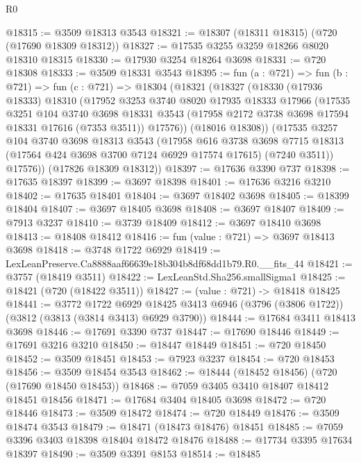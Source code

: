 \begin{lexlean}{R0}
\begin{coremodule}
@18315 := @3509 @18313 @3543
@18321 := @18307 (@18311 @18315) (@720 (@17690 @18309 @18312))
@18327 := @17535 @3255 @3259 @18266 @8020 @18310 @18315
@18330 := @17930 @3254 @18264 @3698
@18331 := @720 @18308
@18333 := @3509 @18331 @3543
@18395 := fun (a : @721) =>
  fun (b : @721) =>
  fun (c : @721) =>
  @18304
    (@18321
      (@18327
        (@18330
          (@17936 @18333)
          @18310
          (@17952
            @3253
            @3740
            @8020
            @17935
            @18333
            @17966
            (@17535
              @3251
              @104
              @3740
              @3698
              @18331
              @3543
              (@17958 @2172 @3738 @3698 @17594 @18331 @17616 (@7353 @3511))
              @17576))
          (@18016 @18308))
        (@17535
          @3257
          @104
          @3740
          @3698
          @18313
          @3543
          (@17958
            @616
            @3738
            @3698
            @7715
            @18313
            (@17564 @424 @3698 @3700 @7124 @6929 @17574 @17615)
            (@7240 @3511))
          @17576))
      (@17826 @18309 @18312))
@18397 := @17636 @3390 @737
@18398 := @17635 @18397
@18399 := @3697 @18398
@18401 := @17636 @3216 @3210
@18402 := @17635 @18401
@18404 := @3697 @18402 @3698
@18405 := @18399 @18404
@18407 := @3697 @18405 @3698
@18408 := @3697 @18407
@18409 := @7913 @3237
@18410 := @3739 @18409
@18412 := @3697 @18410 @3698
@18413 := @18408 @18412
@18416 := fun (value : @721) => @3697 @18413 @3698
@18418 := @3748 @1722 @6929
@18419 := LexLeanPreserve.Ca8888aaf66639e18b304b8df68dd1b79.R0.__fits_44
@18421 := @3757 (@18419 @3511)
@18422 := LexLeanStd.Sha256.smallSigma1
@18425 := @18421 (@720 (@18422 @3511))
@18427 := (value : @721) -> @18418 @18425
@18441 := @3772
    @1722
    @6929
    @18425
    @3413
    @6946
    (@3796 (@3806 @1722))
    (@3812 (@3813 (@3814 @3413) @6929 @3790))
@18444 := @17684 @3411 @18413 @3698
@18446 := @17691 @3390 @737
@18447 := @17690 @18446
@18449 := @17691 @3216 @3210
@18450 := @18447 @18449
@18451 := @720 @18450
@18452 := @3509 @18451
@18453 := @7923 @3237
@18454 := @720 @18453
@18456 := @3509 @18454 @3543
@18462 := @18444 (@18452 @18456) (@720 (@17690 @18450 @18453))
@18468 := @7059 @3405 @3410 @18407 @18412 @18451 @18456
@18471 := @17684 @3404 @18405 @3698
@18472 := @720 @18446
@18473 := @3509 @18472
@18474 := @720 @18449
@18476 := @3509 @18474 @3543
@18479 := @18471 (@18473 @18476) @18451
@18485 := @7059 @3396 @3403 @18398 @18404 @18472 @18476
@18488 := @17734 @3395 @17634 @18397
@18490 := @3509 @3391 @8153
@18514 := @18485

\end{coremodule}
\end{lexlean}
